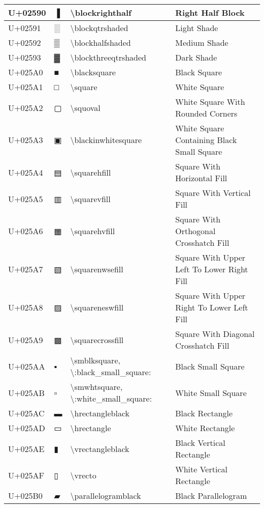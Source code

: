 \begin{table}[h]
\begin{tabulary}{\linewidth}{|L|L|L|L|}
\hline
U+02590 & ▐ & {\textbackslash}blockrighthalf & Right Half Block \\
\hline
U+02591 & ░ & {\textbackslash}blockqtrshaded & Light Shade \\
\hline
U+02592 & ▒ & {\textbackslash}blockhalfshaded & Medium Shade \\
\hline
U+02593 & ▓ & {\textbackslash}blockthreeqtrshaded & Dark Shade \\
\hline
U+025A0 & ■ & {\textbackslash}blacksquare & Black Square \\
\hline
U+025A1 & □ & {\textbackslash}square & White Square \\
\hline
U+025A2 & ▢ & {\textbackslash}squoval & White Square With Rounded Corners \\
\hline
U+025A3 & ▣ & {\textbackslash}blackinwhitesquare & White Square Containing Black Small Square \\
\hline
U+025A4 & ▤ & {\textbackslash}squarehfill & Square With Horizontal Fill \\
\hline
U+025A5 & ▥ & {\textbackslash}squarevfill & Square With Vertical Fill \\
\hline
U+025A6 & ▦ & {\textbackslash}squarehvfill & Square With Orthogonal Crosshatch Fill \\
\hline
U+025A7 & ▧ & {\textbackslash}squarenwsefill & Square With Upper Left To Lower Right Fill \\
\hline
U+025A8 & ▨ & {\textbackslash}squareneswfill & Square With Upper Right To Lower Left Fill \\
\hline
U+025A9 & ▩ & {\textbackslash}squarecrossfill & Square With Diagonal Crosshatch Fill \\
\hline
U+025AA & ▪ & {\textbackslash}smblksquare, {\textbackslash}:black\_small\_square: & Black Small Square \\
\hline
U+025AB & ▫ & {\textbackslash}smwhtsquare, {\textbackslash}:white\_small\_square: & White Small Square \\
\hline
U+025AC & ▬ & {\textbackslash}hrectangleblack & Black Rectangle \\
\hline
U+025AD & ▭ & {\textbackslash}hrectangle & White Rectangle \\
\hline
U+025AE & ▮ & {\textbackslash}vrectangleblack & Black Vertical Rectangle \\
\hline
U+025AF & ▯ & {\textbackslash}vrecto & White Vertical Rectangle \\
\hline
U+025B0 & ▰ & {\textbackslash}parallelogramblack & Black Parallelogram \\

\end{tabulary}
\end{table}
